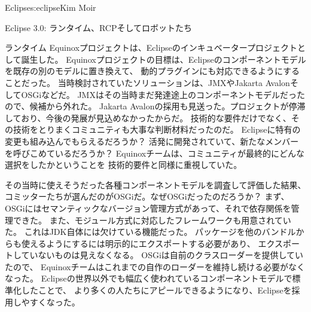 \begin{aosachapter}{Eclipse}{s:eclipse}{Kim Moir}
\begin{aosasect1}{Eclipse 3.0: ランタイム、RCPそしてロボットたち}
\begin{aosasect2}{ランタイム}
Equinoxプロジェクトは、Eclipseのインキュベータープロジェクトとして誕生した。
Equinoxプロジェクトの目標は、Eclipseのコンポーネントモデルを既存の別のモデルに置き換えて、
動的プラグインにも対応できるようにすることだった。
当時検討されていたソリューションは、JMXやJakarta AvalonそしてOSGiなどだ。
JMXはその当時まだ発達途上のコンポーネントモデルだったので、候補から外れた。
Jakarta Avalonの採用も見送った。プロジェクトが停滞しており、今後の発展が見込めなかったからだ。
技術的な要件だけでなく、その技術をとりまくコミュニティも大事な判断材料だったのだ。
Eclipseに特有の変更も組み込んでもらえるだろうか？
活発に開発されていて、新たなメンバーを呼びこめているだろうか？
Equinoxチームは、コミュニティが最終的にどんな選択をしたかということを
技術的要件と同様に重視していた。

その当時に使えそうだった各種コンポーネントモデルを調査して評価した結果、
コミッターたちが選んだのがOSGiだ。なぜOSGiだったのだろうか？
まず、OSGiにはセマンティックなバージョン管理方式があって、それで依存関係を管理できた。
また、モジュール方式に対応したフレームワークも用意されていた。
これはJDK自体には欠けている機能だった。
パッケージを他のバンドルからも使えるようにするには明示的にエクスポートする必要があり、
エクスポートしていないものは見えなくなる。
OSGiは自前のクラスローダーを提供していたので、
Equinoxチームはこれまでの自作のローダーを維持し続ける必要がなくなった。
Eclipseの世界以外でも幅広く使われているコンポーネントモデルで標準化したことで、
より多くの人たちにアピールできるようになり、Eclipseを採用しやすくなった。


\end{aosasect2}
\end{aosasect1}
\end{aosachapter}
